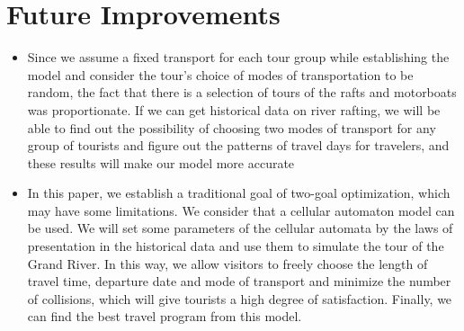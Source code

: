 \section{Future Improvements}

\begin{itemize}
\item Since we assume a fixed transport for each tour group while establishing the model and consider the tour's choice of modes of transportation to be random, the fact that there is a selection of tours of the rafts and motorboats was proportionate. If we can get historical data on river rafting, we will be able to find out the possibility of choosing two modes of transport for any group of tourists and figure out the patterns of travel days for travelers, and these results will make our model more accurate\\
\item In this paper, we establish a traditional goal of two-goal optimization, which may have some limitations. We consider that a cellular automaton model can be used. We will set some parameters of the cellular automata by the laws of presentation in the historical data and use them to simulate the tour of the Grand River. In this way, we allow visitors to freely choose the length of travel time, departure date and mode of transport and minimize the number of collisions, which will give tourists a high degree of satisfaction. Finally, we can find the best travel program from this model.
\end{itemize}